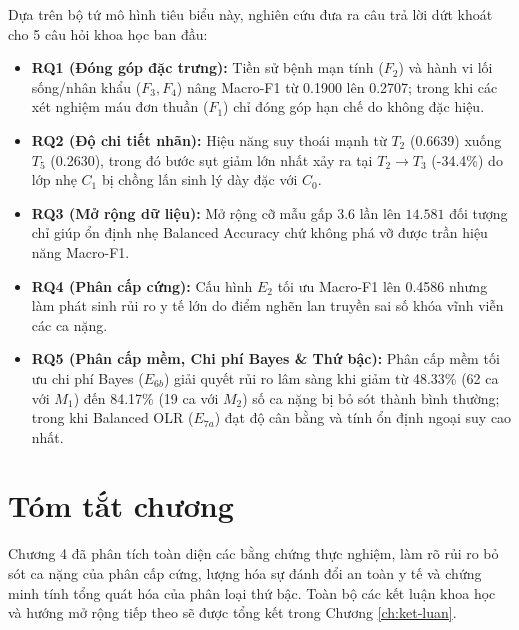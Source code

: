 Dựa trên bộ tứ mô hình tiêu biểu này, nghiên cứu đưa ra câu trả lời dứt khoát cho 5 câu hỏi khoa học ban đầu:
\begin{itemize}
    \item \textbf{RQ1 (Đóng góp đặc trưng):} Tiền sử bệnh mạn tính ($F_2$) và hành vi lối sống/nhân khẩu ($F_3, F_4$) nâng Macro-F1 từ 0.1900 lên 0.2707; trong khi các xét nghiệm máu đơn thuần ($F_1$) chỉ đóng góp hạn chế do không đặc hiệu.
    \item \textbf{RQ2 (Độ chi tiết nhãn):} Hiệu năng suy thoái mạnh từ $T_2$ (0.6639) xuống $T_5$ (0.2630), trong đó bước sụt giảm lớn nhất xảy ra tại $T_2 \to T_3$ (-34.4\%) do lớp nhẹ $C_1$ bị chồng lấn sinh lý dày đặc với $C_0$.
    \item \textbf{RQ3 (Mở rộng dữ liệu):} Mở rộng cỡ mẫu gấp 3.6 lần lên $14.581$ đối tượng chỉ giúp ổn định nhẹ Balanced Accuracy chứ không phá vỡ được trần hiệu năng Macro-F1.
    \item \textbf{RQ4 (Phân cấp cứng):} Cấu hình $E_2$ tối ưu Macro-F1 lên 0.4586 nhưng làm phát sinh rủi ro y tế lớn do điểm nghẽn lan truyền sai số khóa vĩnh viễn các ca nặng.
    \item \textbf{RQ5 (Phân cấp mềm, Chi phí Bayes \& Thứ bậc):} Phân cấp mềm tối ưu chi phí Bayes ($E_{6b}$) giải quyết rủi ro lâm sàng khi giảm từ 48.33\% (62 ca với $M_1$) đến 84.17\% (19 ca với $M_2$) số ca nặng bị bỏ sót thành bình thường; trong khi Balanced OLR ($E_{7a}$) đạt độ cân bằng và tính ổn định ngoại suy cao nhất.
\end{itemize}

\section{Tóm tắt chương}
\label{sec:tom-tat-chuong-4}

Chương 4 đã phân tích toàn diện các bằng chứng thực nghiệm, làm rõ rủi ro bỏ sót ca nặng của phân cấp cứng, lượng hóa sự đánh đổi an toàn y tế và chứng minh tính tổng quát hóa của phân loại thứ bậc. Toàn bộ các kết luận khoa học và hướng mở rộng tiếp theo sẽ được tổng kết trong Chương \ref{ch:ket-luan}.

